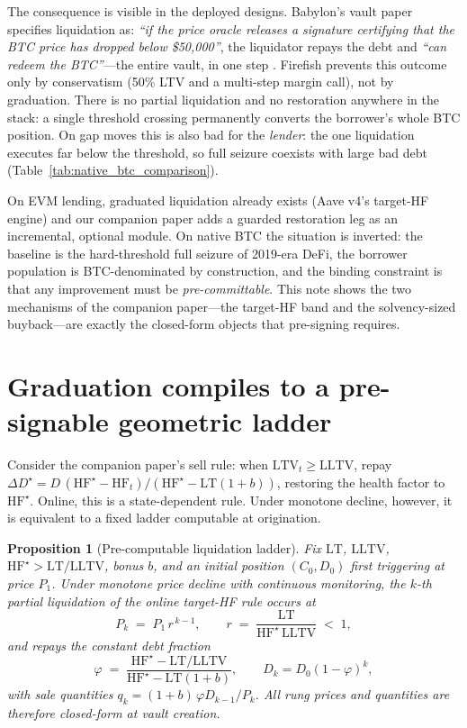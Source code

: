 \documentclass[12pt]{article}
\newtheorem{proposition}{Proposition}
\begin{document}
The consequence is visible in the deployed designs. Babylon's vault paper
specifies liquidation as: \emph{``if the price oracle releases a signature
certifying that the BTC price has dropped below \$50,000''}, the liquidator
repays the debt and \emph{``can redeem the BTC''}---the entire vault, in one
step \cite{babylon-trustless-vaults}. Firefish prevents this outcome only by
conservatism (50\% LTV and a multi-step margin call), not by graduation.
There is no partial liquidation and no restoration anywhere in the stack:
a single threshold crossing permanently converts the borrower's whole BTC
position. On gap moves this is also bad for the \emph{lender}: the one
liquidation executes far below the threshold, so full seizure coexists with
large bad debt (Table~\ref{tab:native_btc_comparison}).

On EVM lending, graduated liquidation already exists (Aave v4's target-HF
engine) and our companion paper adds a guarded restoration leg as an
incremental, optional module. On native BTC the situation is inverted: the
baseline is the hard-threshold full seizure of 2019-era DeFi, the borrower
population is BTC-denominated by construction, and the binding constraint is
that any improvement must be \emph{pre-committable}. This note shows the two
mechanisms of the companion paper---the target-HF band and the solvency-sized
buyback---are exactly the closed-form objects that pre-signing requires.

\section{Graduation compiles to a pre-signable geometric ladder}
\label{sec:ladder}

Consider the companion paper's sell rule: when $\mathrm{LTV}_t \ge
\mathrm{LLTV}$, repay
$\Delta D^{\star} = D\,(\mathrm{HF}^{\star}-\mathrm{HF}_t)/
(\mathrm{HF}^{\star}-\mathrm{LT}(1+b))$, restoring the health factor to
$\mathrm{HF}^{\star}$. Online, this is a state-dependent rule. Under monotone
decline, however, it is equivalent to a fixed ladder computable at origination.

\begin{proposition}[Pre-computable liquidation ladder]
\label{prop:ladder}
Fix $\mathrm{LT}$, $\mathrm{LLTV}$, $\mathrm{HF}^{\star}>\mathrm{LT}/\mathrm{LLTV}$,
bonus $b$, and an initial position $(C_0, D_0)$ first triggering at price
$P_1$. Under monotone price decline with continuous monitoring, the $k$-th
partial liquidation of the online target-HF rule occurs at
\[
P_k \;=\; P_1\, r^{\,k-1},
\qquad
r \;=\; \frac{\mathrm{LT}}{\mathrm{HF}^{\star}\,\mathrm{LLTV}} \;<\; 1,
\]
and repays the constant debt fraction
\[
\varphi \;=\; \frac{\mathrm{HF}^{\star}-\mathrm{LT}/\mathrm{LLTV}}
{\mathrm{HF}^{\star}-\mathrm{LT}(1+b)},
\qquad
D_k = D_0 (1-\varphi)^k ,
\]
with sale quantities $q_k = (1+b)\,\varphi D_{k-1}/P_k$. All rung prices and
quantities are therefore closed-form at vault creation.
\end{proposition}
\end{document}
